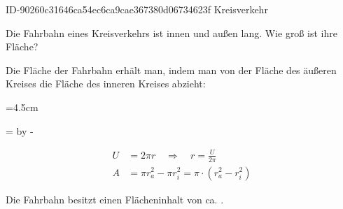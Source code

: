 \begin{exercise}
      {ID-90260c31646ca54ec6ca9cae367380d06734623f}
      {Kreisverkehr}
  \ifproblem\problem\par
    Die Fahrbahn eines Kreisverkehrs ist innen  und außen
     lang. Wie groß ist ihre Fläche?
  \fi
  \ifoutline\outline\par
    Die Fläche der Fahrbahn erhält man, indem man von der Fläche des
    äußeren Kreises die Fläche des inneren Kreises abzieht:\par
    \begingroup
      =4.5cm%
      \begin{minipage}{\dimen1}%
      \end{minipage}%
      =\linewidth%
      \advance{} by -%
      \begin{minipage}{\dimen2}%
        \setlength{\abovedisplayskip}{0pt}%
        \begin{equation*}
          \begin{split}
            U&=2\pi r
            \quad\Rightarrow\quad
            r=\frac{U}{2\pi}
            \\[2ex]
            A&=\pi r_a^2-\pi r_i^2
              =\pi\cdot\left(r_a^2-r_i^2\right)
          \end{split}
        \end{equation*}
      \end{minipage}%
    \endgroup
  \fi
  \ifoutcome\outcome\par
    Die Fahrbahn besitzt einen Flächeninhalt von ca. .
  \fi
\end{exercise}
